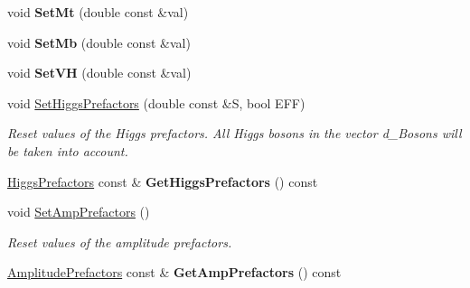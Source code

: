 \begin{DoxyCompactItemize}
\item 
\hypertarget{classHiggsModel_a511bd13bf20268e59567b2049d7a5781}{void {\bfseries Set\-Mt} (double const \&val)}\label{classHiggsModel_a511bd13bf20268e59567b2049d7a5781}

\item 
\hypertarget{classHiggsModel_a460c285dbbd117c30be6ea43f5271e2d}{void {\bfseries Set\-Mb} (double const \&val)}\label{classHiggsModel_a460c285dbbd117c30be6ea43f5271e2d}

\item 
\hypertarget{classHiggsModel_a058daf0cc3b8cad4077419d19d8e4c21}{void {\bfseries Set\-V\-H} (double const \&val)}\label{classHiggsModel_a058daf0cc3b8cad4077419d19d8e4c21}

\item 
void \hyperlink{classHiggsModel_a43f6951291eef31cc18116f7d49f839f}{Set\-Higgs\-Prefactors} (double const \&S, bool E\-F\-F)
\begin{DoxyCompactList}\small\item\em Reset values of the Higgs prefactors. All Higgs bosons in the vector d\-\_\-\-Bosons will be taken into account. \end{DoxyCompactList}\item 
\hypertarget{classHiggsModel_a36b052bac528028a1757554d45901513}{\hyperlink{structHiggsPrefactors}{Higgs\-Prefactors} const \& {\bfseries Get\-Higgs\-Prefactors} () const }\label{classHiggsModel_a36b052bac528028a1757554d45901513}

\item 
\hypertarget{classHiggsModel_a514e3dd7854409c622b8e200fe2ee84c}{void \hyperlink{classHiggsModel_a514e3dd7854409c622b8e200fe2ee84c}{Set\-Amp\-Prefactors} ()}\label{classHiggsModel_a514e3dd7854409c622b8e200fe2ee84c}

\begin{DoxyCompactList}\small\item\em Reset values of the amplitude prefactors. \end{DoxyCompactList}\item 
\hypertarget{classHiggsModel_a77b35a425c80b8d9006354670f91acca}{\hyperlink{structAmplitudePrefactors}{Amplitude\-Prefactors} const \& {\bfseries Get\-Amp\-Prefactors} () const }\label{classHiggsModel_a77b35a425c80b8d9006354670f91acca}


\end{DoxyCompactItemize}
